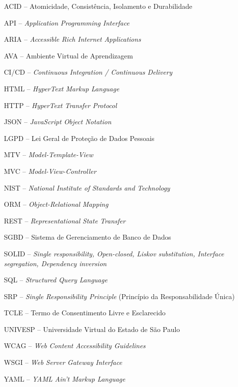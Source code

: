 \begin{singlespace}
\setlength{\parindent}{0pt}

\noindent ACID -- Atomicidade, Consistência, Isolamento e Durabilidade

\noindent API -- \textit{Application Programming Interface}

\noindent ARIA -- \textit{Accessible Rich Internet Applications}

\noindent AVA -- Ambiente Virtual de Aprendizagem

\noindent CI/CD -- \textit{Continuous Integration / Continuous Delivery}

\noindent HTML -- \textit{HyperText Markup Language}

\noindent HTTP -- \textit{HyperText Transfer Protocol}

\noindent JSON -- \textit{JavaScript Object Notation}

\noindent LGPD -- Lei Geral de Proteção de Dados Pessoais

\noindent MTV -- \textit{Model-Template-View}

\noindent MVC -- \textit{Model-View-Controller}

\noindent NIST -- \textit{National Institute of Standards and Technology}

\noindent ORM -- \textit{Object-Relational Mapping}

\noindent REST -- \textit{Representational State Transfer}

\noindent SGBD -- Sistema de Gerenciamento de Banco de Dados

\noindent SOLID -- \textit{Single responsibility, Open-closed, Liskov substitution, Interface segregation, Dependency inversion}

\noindent SQL -- \textit{Structured Query Language}

\noindent SRP -- \textit{Single Responsibility Principle} (Princípio da Responsabilidade Única)

\noindent TCLE -- Termo de Consentimento Livre e Esclarecido

\noindent UNIVESP -- Universidade Virtual do Estado de São Paulo

\noindent WCAG -- \textit{Web Content Accessibility Guidelines}

\noindent WSGI -- \textit{Web Server Gateway Interface}

\noindent YAML -- \textit{YAML Ain't Markup Language}

\end{singlespace}

\clearpage
